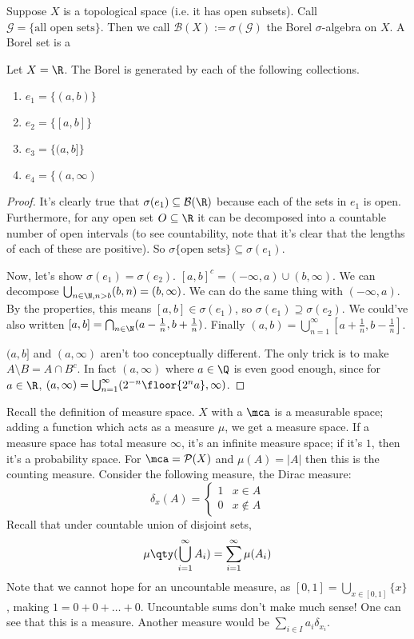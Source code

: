 Suppose $X$ is a topological space (i.e. it has open subsets). Call $\mathcal{G} = \{\text{all open sets}\}$.
Then we call $\mathcal{B}(X) := \sigma(\mathcal{G})$ the Borel $\sigma$-algebra on $X$. A Borel set is a 
\begin{theorem}
Let $X = \R$. The Borel \sa is generated by each of the following collections.
\begin{enumerate}
    \item $e_1 = \{(a, b)\}$
    \item $e_2 = \{ [a, b]\}$
    \item $e_3 = \{ (a, b] \}$
    \item $e_4 = \{(a, \infty)$
\end{enumerate}
\begin{proof}
    It's clearly true that $\sigma(e_1) \subseteq \mathcal{B}(\R)$
    because each of the sets in $e_1$ is open.
    Furthermore, for any open set $O \subseteq \R$ it can be decomposed into a countable number of open intervals
    (to see countability, note that it's clear that the lengths of each of these are positive).
    So $\sigma\{\text{open sets}\} \subseteq \sigma(e_1)$.

    Now, let's show $\sigma(e_1) = \sigma(e_2)$. $[a, b]^c = (-\infty, a) \cup (b, \infty)$. We can decompose $\bigcup_{n \in \N, n > b} (b, n) = (b, \infty)$.
    We can do the same thing with $(-\infty, a)$. By the \sa properties, this means $[a, b] \in \sigma(e_1)$,
    so $\sigma(e_1) \supseteq \sigma(e_2)$. We could've also written $[a, b] = \bigcap_{n \in \N} (a - \frac{1}{n}, b + \frac{1}{n})$.
    Finally $(a, b) = \bigcup_{n = 1}^{\infty} [a + \frac{1}{n}, b - \frac{1}{n}]$.

    $(a, b]$ and $(a, \infty)$ aren't too conceptually different. The only trick is to make $A \setminus B = A \cap B^c$. In fact $(a, \infty)$ where $a \in \Q$ is even good enough,
    since for $a \in \R$, $(a, \infty) = \bigcup_{n = 1}^{\infty} (2^{-n} \floor{2^n a}, \infty)$.
\end{proof}
\end{theorem}
Recall the definition of measure space. $X$ with a \sa $\mca$ is a measurable space; adding a function which acts as a measure $\mu$,
we get a measure space. If a measure space has total measure $\infty$, it's an infinite measure space; if it's $1$, then it's a
probability space. For $\mca = \mathcal{P}(X)$ and $\mu(A) = |A|$ then this is the counting measure.
Consider the following measure, the Dirac measure:
\[ \delta_x(A) = \begin{cases}
    1 & x \in A\\
    0 & x \notin A
\end{cases} \]
Recall that under countable union of disjoint sets,
\[ \mu\qty(\bigcup_{i = 1}^{\infty} A_i) = \sum_{i = 1}^{\infty} \mu(A_i) \]
Note that we cannot hope for an uncountable measure, as $[0, 1] = \bigcup_{x \in [0, 1]} \{x\}$,
making $1 = 0 + 0 + \dots + 0$. Uncountable sums don't make much sense!
One can see that this is a measure. Another measure would be $\sum_{i \in I} a_i \delta_{x_i}$.